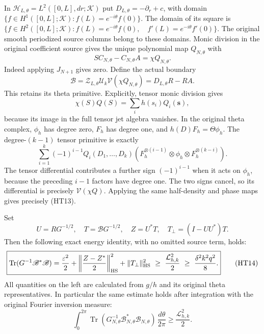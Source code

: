 In $\mathcal H_{L,\theta}=L^2([0,L],dr;\mathcal K)$ put
$D_{L,\theta}=-\partial_r+c$, with domain
$\{f\in H^1([0,L];\mathcal K):f(L)=e^{-i\theta}f(0)\}$.
The domain of its square is
$\{f\in H^2([0,L];\mathcal K):f(L)=e^{-i\theta}f(0),\quad
f'(L)=e^{-i\theta}f'(0)\}$.
The original smooth periodized source columns belong to these domains.
Monic division in the original coefficient
source gives the unique polynomial map $Q_{N,\theta}$ with
\[
 SC_{N,\theta}-C_{N,\theta}A=\chi Q_{N,\theta}.
\]
Indeed applying $J_{N+1}$ gives zero.  Define the actual boundary
\[
 \mathscr B=\mathcal Z_{L,\theta}\mathcal U_k
 \mathcal V(\chi Q_{N,\theta})
 =D_{L,\theta}R-RA.
 \tag{HT13}
\]
This retains its theta primitive.  Explicitly, tensor monic division gives
\[
 \chi(S)Q(S)=\sum_i h(s_i)Q_i(\mathbf s),
\]
because its image in the full tensor jet algebra vanishes.  In the original
theta complex, $\phi_h$ has degree zero, $F_h$ has degree one, and
$h(D)F_h=\Theta\phi_h$.  The degree-$(k-1)$ tensor primitive is exactly
\[
 \sum_{i=1}^k(-1)^{i-1}Q_i(D_1,\ldots,D_k)
 (F_h^{\otimes(i-1)}\otimes\phi_h\otimes F_h^{\otimes(k-i)}).
\]
The tensor differential contributes a further sign $(-1)^{i-1}$ when
it acts on $\phi_h$, because the preceding $i-1$ factors have degree one.
The two signs cancel, so its differential is precisely
$\mathcal V(\chi Q)$.  Applying the same half-density
and phase maps gives precisely (HT13).

Set
\[
 U=RG^{-1/2},\quad T=\mathscr BG^{-1/2},\quad Z=U^*T,
 \quad T_\perp=(I-UU^*)T.
\]
Then the following exact energy identity, with no omitted source term,
holds:
\[
 \boxed{
 \operatorname{Tr}(G^{-1}\mathscr B^*\mathscr B)
 =\frac{\varepsilon^2}{2}
 +\left\|\frac{Z-Z^*}{2}\right\|_{\rm HS}^{2}
 +\|T_\perp\|_{\rm HS}^{2}
 \ \geq\ \frac{\mathcal L_{h,k}^2}{2}
 \ \geq\ \frac{\delta^2k^2q^2}{8}.}
 \tag{HT14}
\]
All quantities on the left are calculated from $g/h$ and its original
theta representatives.  In particular the same estimate holds after
integration with the original Fourier inversion measure:
\[
 \int_0^{2\pi}\operatorname{Tr}
 (G_{N,\theta}^{-1}\mathscr B_{N,\theta}^*
 \mathscr B_{N,\theta})\,\frac{d\theta}{2\pi}
 \geq\frac{\mathcal L_{h,k}^2}{2}.
 \tag{HT15}
\]

